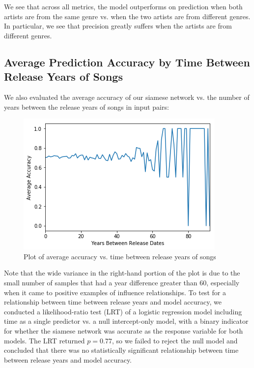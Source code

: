 We see that across all metrics, the model outperforms on prediction when both artists are from the same genre vs. when the two artists are from different genres. In particular, we see that precision greatly suffers when the artists are from different genres.

\subsection{Average Prediction Accuracy by Time Between Release Years of Songs}
We also evaluated the average accuracy of our siamese network vs. the number of years between the release years of songs in input pairs:

\begin{figure}[H]
\includegraphics[width=\textwidth]{figures/acc_by_year.png}
\caption{Plot of average accuracy vs. time between release years of songs}
\end{figure}

Note that the wide variance in the right-hand portion of the plot is due to the small number of samples that had a year difference greater than $60$, especially when it came to positive examples of influence relationships. To test for a relationship between time between release years and model accuracy, we conducted a likelihood-ratio test (LRT) of a logistic regression model including time as a single predictor vs. a null intercept-only model, with a binary indicator for whether the siamese network was accurate as the response variable for both models. The LRT returned $p=0.77$, so we failed to reject the null model and concluded that there was no statistically significant relationship between time between release years and model accuracy.

